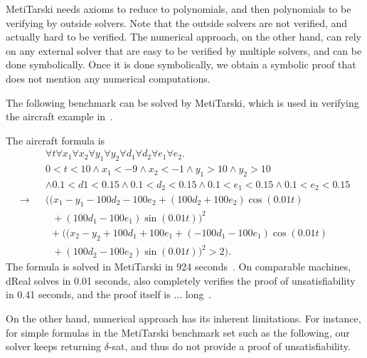 \documentclass[envcountsect]{llncs}
\begin{document}
MetiTarski needs axioms to reduce to polynomials, and then polynomials to be
verifying by outside solvers. Note that the outside solvers are not verified,
and actually hard to be verified. The numerical approach, on the other hand,
can rely on any external solver that are easy to be verified by multiple
solvers, and can be done symbolically. Once it is done symbolically, we obtain
a symbolic proof that does not mention any numerical computations.

The following benchmark can be solved by MetiTarski, which is used in verifying
the aircraft example in~\cite{}.
\begin{example}[Aircraft]
The aircraft formula is
\begin{eqnarray*}
& &\forall t \forall x_1\forall x_2 \forall y_1\forall y_2\forall
d_1\forall d_2\forall e_1\forall e_2. \\
& &0<t<10\wedge x_1<-9 \wedge x_2<-1\wedge
y_1>10 \wedge y_2>10\\
& & \wedge 0.1<d1< 0.15\wedge 0.1<d_2<0.15 \wedge
0.1<e_1<0.15\wedge 0.1<e_2<0.15 \\
\rightarrow & &\Big(
\Big(x_1-y_1-100d_2-100e_2+(100d_2+100e_2)\cos(0.01t)\\
& &\ \ \ + (100d_1
-100e_1)\sin(0.01t)\Big)^2\\
& & \ \ +\Big((x_2-y_2+100d_1+100e_1+(-100d_1-100e_1)\cos(0.
0 1 t ) \\
& &\ \ \  + (100d_2 - 100e_2)\sin(0.01t)\Big)^2 > 2\Big).
\end{eqnarray*}
The formula is solved in MetiTarski in 924
seconds~\cite{}. On comparable machines, dReal solves in 0.01 seconds, also
completely verifies the proof of unsatisfiability in 0.41 seconds, and the
proof itself is ... long~\cite{}.
\end{example}
On the other hand, numerical approach has its inherent limitations. For
instance, for simple formulas in the MetiTarski benchmark set such as the
following, our solver keeps returning $\delta$-sat, and thus do not provide a
proof of unsatisfiability.
\begin{example}

\end{example}
\end{document}
